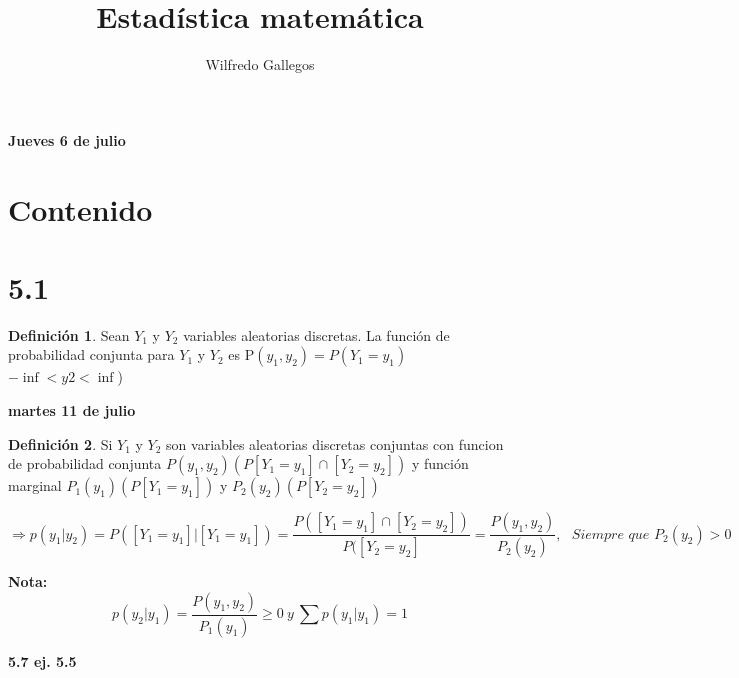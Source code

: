 \documentclass[12pt,letterpaper]{article}
\title{Estadística matemática}
\author{Wilfredo Gallegos}
\theoremstyle{definition}
\newtheorem{definition}{Definición}[section]
\begin{document}
\maketitle

\textbf{Jueves 6 de julio}
\section{Contenido}
\section*{5.1}
\begin{definition}
	Sean $Y_1$ y $Y_2$ variables aleatorias discretas. La función de probabilidad conjunta para $Y_1$ y $Y_2$ es P$(y_1,y_2)=P(Y_1=y_1)$ $-\inf < y2<\inf$)
\end{definition}

\newpage
\textbf{martes 11 de julio}

\begin{definition}
	Si $Y_1$ y $Y_2$ son variables aleatorias discretas conjuntas con funcion de probabilidad conjunta $P(y_1,y_2)(P[Y_1=y_1]\cap [Y_2=y_2])$ y función marginal $P_1(y_1)(P[Y_1=y_1])$ y $P_2(y_2)(P[Y_2=y_2])$

\[\Rightarrow p(y_1|y_2) = P([Y_1=y_1]|[Y_1=y_1])=\frac{P([Y_1=y_1]\cap [Y_2=y_2])}{P([Y_2=y_2]}=\frac{P(y_1,y_2)}{P_2(y_2)},\ \ \ \textit{Siempre que } P_2(y_2)>0\]
\end{definition}

\textbf{Nota: } 
\[p(y_2|y_1)=\frac{P(y_1,y_2)}{P_1(y_1)}\geq 0\ y\ \sum p(y_1|y_1)=1\]

\textbf{5.7 ej. 5.5}
\end{document}

